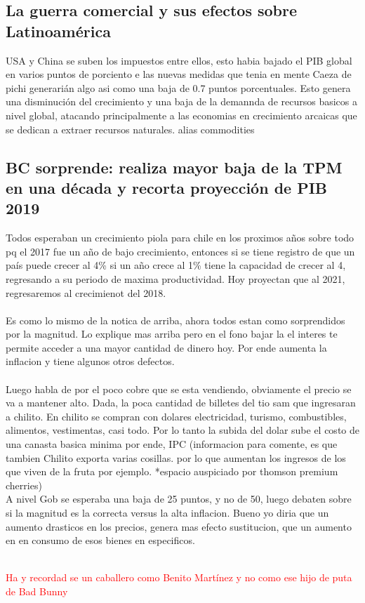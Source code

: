 \subsection{La guerra comercial y sus efectos sobre Latinoamérica}
USA y China se suben los impuestos entre ellos, esto habia bajado el PIB global en varios puntos de porciento e las nuevas medidas que tenia en mente Caeza de pichi generarián algo asi como una baja de 0.7 puntos porcentuales. Esto genera una disminución del crecimiento y una baja de la demannda de recursos basicos a nivel global, atacando principalmente a las economias en crecimiento arcaicas que se dedican a extraer recursos naturales. alias commodities 
	
\subsection{BC sorprende: realiza mayor baja de la TPM en una década y recorta proyección de PIB 2019}
Todos esperaban un crecimiento piola para chile en los proximos años sobre todo pq el 2017 fue un año de bajo crecimiento, entonces si se tiene registro de que un país puede crecer al 4\% si un año crece al 1\% tiene la capacidad de crecer al 4, regresando a su periodo de maxima productividad. 
Hoy proyectan que al 2021, regresaremos al crecimienot del 2018. 
\\
\\
Es como lo mismo de la notica de arriba, ahora todos estan como sorprendidos por la magnitud. Lo explique mas arriba pero en el fono bajar la el interes te permite acceder a una mayor cantidad de dinero hoy. Por ende aumenta la inflacion y tiene algunos otros defectos. 
\\
\\
Luego habla de por el poco cobre que se esta vendiendo, obviamente el precio se va a mantener alto. Dada, la poca cantidad de billetes del tio sam que ingresaran a chilito. En chilito se compran con dolares electricidad, turismo, combustibles, alimentos, vestimentas, casi todo. Por lo tanto la subida del dolar sube el costo de una canasta basica minima por ende, IPC (informacion para comente, es que tambien Chilito exporta varias cosillas. por lo que aumentan los ingresos de los que viven de la fruta por ejemplo. *espacio auspiciado por thomson premium cherries)
\\
A nivel Gob se esperaba una baja de 25 puntos, y no de 50, luego debaten sobre si la magnitud es la correcta versus la alta inflacion. Bueno yo diria que un aumento drasticos en los precios, genera mas efecto sustitucion, que un aumento en en consumo de esos bienes en especificos. 

\subitem
\centering
\\
\textcolor{Red}{Ha y recordad se un caballero como Benito Martínez y no como ese hijo de puta de Bad Bunny}


